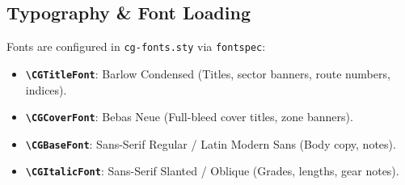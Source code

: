 \subsection{Typography \& Font Loading}
Fonts are configured in \texttt{cg-fonts.sty} via \texttt{fontspec}:
\begin{itemize}
    \item \textbf{\texttt{\textbackslash CGTitleFont}}: Barlow Condensed (Titles, sector banners, route numbers, indices).
    \item \textbf{\texttt{\textbackslash CGCoverFont}}: Bebas Neue (Full-bleed cover titles, zone banners).
    \item \textbf{\texttt{\textbackslash CGBaseFont}}: Sans-Serif Regular / Latin Modern Sans (Body copy, notes).
    \item \textbf{\texttt{\textbackslash CGItalicFont}}: Sans-Serif Slanted / Oblique (Grades, lengths, gear notes).
\end{itemize}
